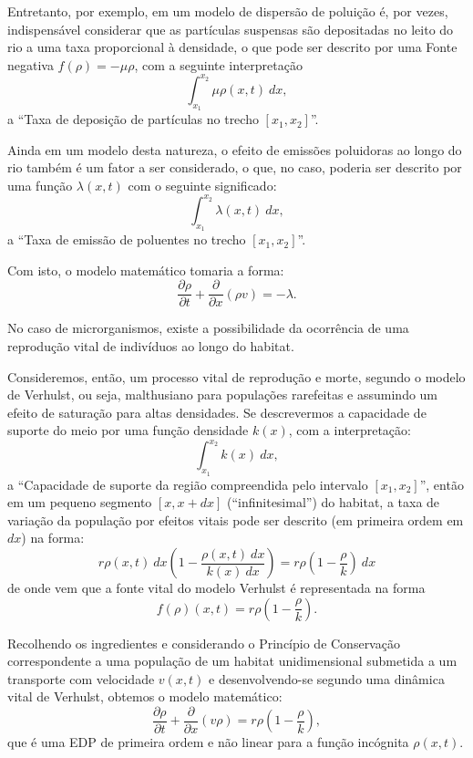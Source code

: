 Entretanto, por exemplo, em um modelo de dispersão de poluição é, por vezes, indispensável considerar que as partículas suspensas são depositadas no leito do rio a uma taxa proporcional à densidade, o que pode ser descrito por uma Fonte negativa \(f(\rho) = -\mu \rho\), com a seguinte interpretação
\[\displaystyle\int_{x_1}^{x_2} \mu \rho(x,t)\ dx,\]
a ``Taxa de deposição de partículas no trecho \([x_1, x_2]\)''. 

Ainda em um modelo desta natureza, o efeito de emissões poluidoras ao longo do rio também é um fator a ser considerado, o que, no caso, poderia ser descrito por uma função \(\lambda(x,t)\) com o seguinte significado:
\[\displaystyle\int_{x_1}^{x_2} \lambda(x,t)\ dx,\]
a ``Taxa de emissão de poluentes no trecho \([x_1, x_2]\)''.

Com isto, o modelo matemático tomaria a forma:
\begin{equation}
\dfrac{\partial \rho}{\partial t} + \dfrac{\partial }{\partial x} (\rho v) = -\lambda.
\end{equation}

No caso de microrganismos, existe a possibilidade da ocorrência de uma reprodução vital de indivíduos ao longo do habitat.

Consideremos, então, um processo vital de reprodução e morte, segundo o modelo de Verhulst, ou seja, malthusiano para populações rarefeitas e assumindo um efeito de saturação para altas densidades. Se descrevermos a capacidade de suporte do meio por uma função densidade \(k(x)\), com a interpretação:
\[\displaystyle\int_{x_1}^{x_2} k(x)\ dx,\]
a ``Capacidade de suporte da região compreendida pelo intervalo \([x_1, x_2]\)'', então em um pequeno segmento \([x, x+dx]\) (``infinitesimal'') do habitat, a taxa de variação da população por efeitos vitais pode ser descrito (em primeira ordem em \(dx\)) na forma:
\[r\rho(x,t)\ dx \left(1 - \dfrac{\rho(x,t)\ dx}{k(x)\ dx}\right) = r\rho \left(1 - \dfrac{\rho}{k}\right)\ dx\]
de onde vem que a fonte vital do modelo Verhulst é representada na forma \begin{equation}
f(\rho)(x,t) = r\rho \left(1 - \dfrac{\rho}{k}\right).
\end{equation}

Recolhendo os ingredientes e considerando o Princípio de Conservação correspondente a uma população de um habitat unidimensional submetida a um transporte com velocidade \(v(x,t)\) e desenvolvendo-se segundo uma dinâmica vital de Verhulst, obtemos o modelo matemático:
\begin{equation}\label{eq:dvverhulst}
\dfrac{\partial \rho}{\partial t} + \dfrac{\partial }{\partial x} (v\rho) = r\rho \left(1 - \dfrac{\rho}{k}\right),
\end{equation}
que é uma EDP de primeira ordem e não linear para a função incógnita \(\rho(x,t)\).

